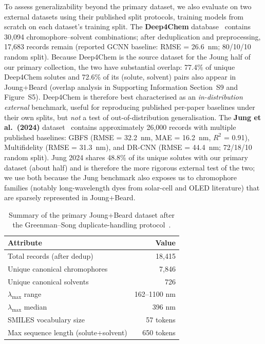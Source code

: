 \documentclass[journal=jcisd8,manuscript=article]{achemso}
\begin{document}
To assess generalizability beyond the primary dataset, we also evaluate on two external datasets using their published split protocols, training models from scratch on each dataset's training split.
The \textbf{Deep4Chem} database~\cite{joung2021deep} contains 30,094 chromophore--solvent combinations; after deduplication and preprocessing, 17,683 records remain (reported GCNN baseline: RMSE = 26.6~nm; 80/10/10 random split). Because Deep4Chem is the source dataset for the Joung half of our primary collection, the two have substantial overlap: 77.4\% of unique Deep4Chem solutes and 72.6\% of its (solute, solvent) pairs also appear in Joung+Beard (overlap analysis in Supporting Information Section~S9 and Figure~S5). Deep4Chem is therefore best characterised as an \emph{in-distribution external} benchmark, useful for reproducing published per-paper baselines under their own splits, but \emph{not} a test of out-of-distribution generalisation.
The \textbf{Jung et al.\ (2024)} dataset~\cite{jung2024machine} contains approximately 26,000 records with multiple published baselines: GBFS (RMSE = 32.2~nm, MAE = 16.2~nm, $R^2$ = 0.91), Multifidelity (RMSE = 31.3~nm), and DR-CNN (RMSE = 44.4~nm; 72/18/10 random split). Jung 2024 shares 48.8\% of its unique solutes with our primary dataset (about half) and is therefore the more rigorous external test of the two; we use both because the Jung benchmark also exposes us to chromophore families (notably long-wavelength dyes from solar-cell and OLED literature) that are sparsely represented in Joung+Beard.

\begin{table}[htbp]
\centering
\caption{Summary of the primary Joung+Beard dataset after the Greenman--Song duplicate-handling protocol~\cite{greenman2022multifidelity,song2025fluortools}.}
\label{tab:dataset_summary}
\begin{tabular}{lr}
\toprule
\textbf{Attribute} & \textbf{Value} \\
\midrule
Total records (after dedup) & 18,415 \\
Unique canonical chromophores & 7,846 \\
Unique canonical solvents & 726 \\
$\lambda_{\max}$ range & 162--1100 nm \\
$\lambda_{\max}$ median & 396 nm \\
SMILES vocabulary size & 57 tokens \\
Max sequence length (solute+solvent) & 650 tokens \\
\bottomrule
\end{tabular}
\end{table}
\end{document}
